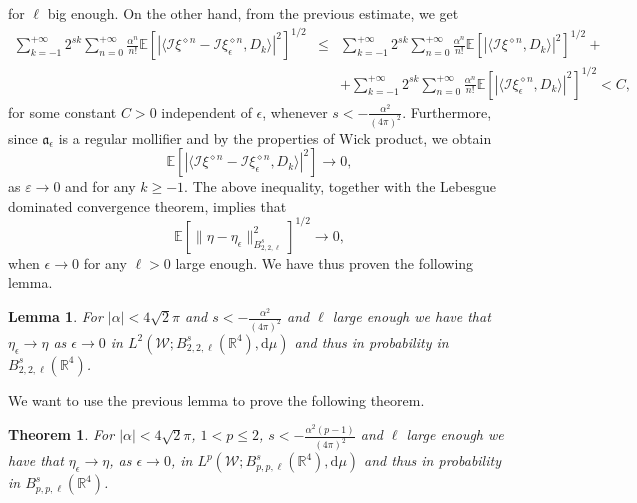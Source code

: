 \documentclass[a4paper,10pt]{article}
\newcommand{\mathd}{\mathrm{d}}
\newtheorem{lemma}{Lemma}
\newtheorem{theorem}{Theorem}
\begin{document}
for $\ell$ big enough. On the other hand, from the previous estimate, we get
\begin{eqnarray}
  \sum_{k = - 1}^{+ \infty} 2^{s k} \sum^{+ \infty}_{n = 0}
  \frac{\alpha^n}{n!} \mathbb{E} [| \langle \mathcal{I} \xi^{\diamond n} -
  \mathcal{I} \xi_{\epsilon}^{\diamond n}, D_k \rangle |^2]^{1 / 2} &
  \leqslant & \sum_{k = - 1}^{+ \infty} 2^{s k} \sum^{+ \infty}_{n = 0}
  \frac{\alpha^n}{n!} \mathbb{E} [| \langle \mathcal{I} \xi^{\diamond n}, D_k
  \rangle |^2]^{1 / 2} + \nonumber\\
  &  & + \sum_{k = - 1}^{+ \infty} 2^{s k} \sum^{+ \infty}_{n = 0}
  \frac{\alpha^n}{n!} \mathbb{E} [| \langle \mathcal{I}
  \xi_{\epsilon}^{\diamond n}, D_k \rangle |^2]^{1 / 2} < C, \nonumber
\end{eqnarray}
for some constant $C > 0$ independent of $\epsilon$, whenever $s < -
\frac{\alpha^2}{(4 \pi)^2}$. Furthermore, since $\mathfrak{a}_{\epsilon}$ is a
regular mollifier and by the properties of Wick product, we obtain
\[ \mathbb{E} [| \langle \mathcal{I} \xi^{\diamond n} - \mathcal{I}
   \xi_{\epsilon}^{\diamond n}, D_k \rangle |^2] \rightarrow 0, \]
as $\varepsilon \rightarrow 0$ and for any $k \geq - 1$. The above inequality,
together with the Lebesgue dominated convergence theorem, implies that
\[ \mathbb{E} [\| \eta - \eta_{\epsilon} \|_{B^s_{2, 2, \ell}}^2]^{1 / 2}
   \rightarrow 0, \]
when $\epsilon \rightarrow 0$ for any $\ell > 0$ large enough. We have thus
proven the following lemma.

\begin{lemma}
  \label{lemma_L2}For $| \alpha | < 4 \sqrt{2} \pi$ and $s < -
  \frac{\alpha^2}{(4 \pi)^2}$ and $\ell$ large enough we have that
  $\eta_{\epsilon} \rightarrow \eta$ as $\epsilon \rightarrow 0$ in $L^2
  (\mathcal{W} ; B^s_{2, 2, \ell} (\mathbb{R}^4), \mathd \mu)$ and thus in
  probability in $B^s_{2, 2, \ell} (\mathbb{R}^4)$.
\end{lemma}

We want to use the previous lemma to prove the following theorem.

\begin{theorem}
  \label{theorem_Lp}For $| \alpha | < 4 \sqrt{2} \pi$, $1 < p \leqslant 2$, $s
  < - \frac{\alpha^2 (p - 1)}{(4 \pi)^2}$ and $\ell$ large enough we have that
  $\eta_{\epsilon} \rightarrow \eta$, as $\epsilon \rightarrow 0$, in $L^p
  (\mathcal{W} ; B^s_{p, p, \ell} (\mathbb{R}^4), \mathd \mu)$ and thus in
  probability in $B^s_{p, p, \ell} (\mathbb{R}^4)$.
\end{theorem}
\end{document}
